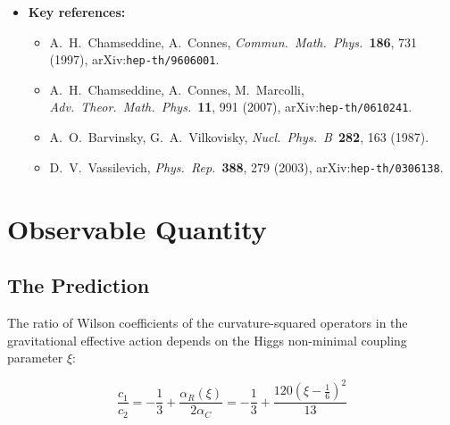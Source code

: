 \documentclass[11pt,a4paper]{article}
\begin{document}
\begin{itemize}[leftmargin=2em]
\begin{enumerate}
        where $N_s = 4$ (Higgs doublet), $N_D = N_f/2 = 45/2$ (Dirac-equivalent fermions,
        following Chamseddine--Connes--Marcolli, arXiv:0610241), and $N_v = 12$ (gauge bosons).
      \item Converting to the $\{R^2, R_{\mu\nu}R^{\mu\nu}\}$ basis via Gauss--Bonnet:
        \begin{align}
          c_1 &= \alpha_R - \frac{2}{3}\alpha_C \quad \text{(coefficient of $R^2$)} \label{eq:c1}\\[4pt]
          c_2 &= 2\alpha_C \quad \text{(coefficient of $R_{\mu\nu}R^{\mu\nu}$)} \label{eq:c2}
        \end{align}
    \end{enumerate}
  \item \textbf{Key references:}
    \begin{itemize}
      \item A.~H.~Chamseddine, A.~Connes, \textit{Commun.\ Math.\ Phys.}\ \textbf{186}, 731 (1997), arXiv:\texttt{hep-th/9606001}.
      \item A.~H.~Chamseddine, A.~Connes, M.~Marcolli, \textit{Adv.\ Theor.\ Math.\ Phys.}\ \textbf{11}, 991 (2007), arXiv:\texttt{hep-th/0610241}.
      \item A.~O.~Barvinsky, G.~A.~Vilkovisky, \textit{Nucl.\ Phys.~B}\ \textbf{282}, 163 (1987).
      \item D.~V.~Vassilevich, \textit{Phys.\ Rep.}\ \textbf{388}, 279 (2003), arXiv:\texttt{hep-th/0306138}.
    \end{itemize}
\end{itemize}

\section{Observable Quantity}

\subsection{The Prediction}

The ratio of Wilson coefficients of the curvature-squared operators in the gravitational
effective action depends on the Higgs non-minimal coupling parameter $\xi$:

\begin{equation}
  \boxed{
    \frac{c_1}{c_2} = -\frac{1}{3} + \frac{\alpha_R(\xi)}{2\alpha_C}
    = -\frac{1}{3} + \frac{120\!\left(\xi - \frac{1}{6}\right)^{\!2}}{13}
  }
  \label{eq:ratio}
\end{equation}
\end{document}

